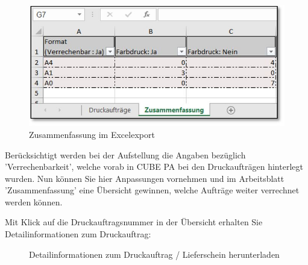 \begin{figure}   %
  \vspace{-25pt}      %
  \begin{center}
    \includegraphics[width=1\linewidth]{../chapters/11_Dokumentenablage/pictures/dok_DruckauftrExcelZu.jpg}
  \end{center}
  \vspace{-20pt}
  \caption{Zusammenfassung im Excelexport}
  \vspace{-10pt}
\end{figure}

Berücksichtigt werden bei der Aufstellung die Angaben bezüglich 'Verrechenbarkeit', welche vorab in CUBE PA bei den Druckaufträgen hinterlegt wurden. Nun können Sie hier Anpassungen vornehmen und im Arbeitsblatt 'Zusammenfassung' eine Übersicht gewinnen, welche Aufträge weiter verrechnet werden können.

\vspace{1.5cm}

Mit Klick auf die Druckauftragsnummer in der Übersicht  erhalten Sie Detailinformationen zum Druckauftrag:

\begin{figure}[H]
\caption{Detailinformationen zum Druckauftrag / Lieferschein herunterladen}
\end{figure}

